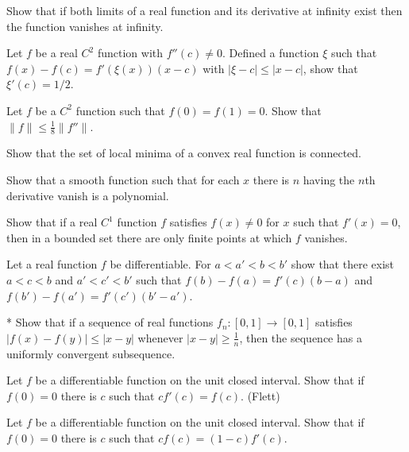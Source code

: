\documentclass[11pt]{article}
\begin{document}
	\begin{prb}
	Show that if both limits of a real function and its derivative at infinity exist then the function vanishes at infinity.
	\end{prb}

	\begin{prb}
	Let $f$ be a real $C^2$ function with $f''(c)\ne0$. Defined a function $\xi$ such that $f(x)-f(c)=f'(\xi(x))(x-c)$ with $|\xi-c|\le|x-c|$, show that $\xi'(c)=1/2$.
	\end{prb}

	\begin{prb}
	Let $f$ be a $C^2$ function such that $f(0)=f(1)=0$. Show that $\|f\|\le\frac18\|f''\|$.
	\end{prb}

	\begin{prb}
	Show that the set of local minima of a convex real function is connected.
	\end{prb}

	\begin{prb}
	Show that a smooth function such that for each $x$ there is $n$ having the $n$th derivative vanish is a polynomial.
	\end{prb}

	\begin{prb}
	Show that if a real $C^1$ function $f$ satisfies $f(x)\ne0$ for $x$ such that $f'(x)=0$, then in a bounded set there are only finite points at which $f$ vanishes.
	\end{prb}

	\begin{prb}
	Let a real function $f$ be differentiable. For $a<a'<b<b'$ show that there exist $a<c<b$ and $a'<c'<b'$ such that $f(b)-f(a)=f'(c)(b-a)$ and $f(b')-f(a')=f'(c')(b'-a')$.
	\end{prb}

	\begin{prb}*
	Show that if a sequence of real functions $f_n\colon[0,1]\to[0,1]$ satisfies $|f(x)-f(y)|\le|x-y|$ whenever $|x-y|\ge\frac1n$, then the sequence has a uniformly convergent subsequence.
	\end{prb}

	\begin{prb}
	Let $f$ be a differentiable function on the unit closed interval. Show that if $f(0)=0$ there is $c$ such that $cf'(c)=f(c)$. (Flett)
	\end{prb}

	\begin{prb}
	Let $f$ be a differentiable function on the unit closed interval. Show that if $f(0)=0$ there is $c$ such that $cf(c)=(1-c)f'(c)$.
	\end{prb}
\end{document}
